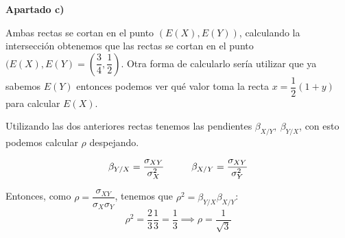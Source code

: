 \documentclass[openany]{book}
\begin{document}
\begin{exercise}
    \begin{flushright}
        \textbf{Apartado c)}
    \end{flushright}

    Ambas rectas se cortan en el punto $ (E(X),E(Y)) $, calculando la intersección obtenemos que las rectas se cortan en el punto $ (E(X),E(Y) = (\dfrac{3}{4},\dfrac{1}{2})$. Otra forma de calcularlo sería utilizar que ya sabemos $ E(Y) $ entonces podemos ver qué valor toma la recta $ x = \dfrac{1}{2}(1+y) $ para calcular $ E(X) $. 

    Utilizando las dos anteriores rectas tenemos las pendientes $ \beta_{X/Y},\ \beta_{Y/X} $, con esto podemos calcular $ \rho $ despejando.

    $$ \beta_{Y/X} = \dfrac{\sigma_{XY}}{\sigma_{X}^2}\hspace{10mm} \beta_{X/Y} = \dfrac{\sigma_{XY}}{\sigma_{Y}^2} $$

    Entonces, como $ \rho = \dfrac{\sigma_{XY}}{\sigma_{X}\sigma_{Y}} $, tenemos que $ \rho^2 = \beta_{Y/X}\beta_{X/Y} $:
    $$ \rho ^2 = \dfrac{2}{3}\dfrac{1}{3} = \dfrac{1}{3} \implies \rho = \dfrac{1}{\sqrt{3}} $$

\end{exercise}
\end{document}

